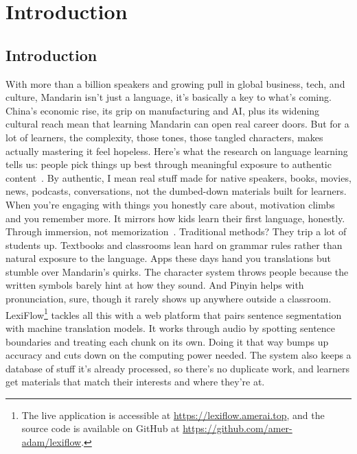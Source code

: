\chapter{Introduction}
\section{Introduction}With more than a billion speakers and growing pull in global business, tech, and culture, Mandarin isn't just a language, it's basically a key to what's coming. China's economic rise, its grip on manufacturing and AI, plus its widening cultural reach mean that learning Mandarin can open real career doors. But for a lot of learners, the complexity, those tones, those tangled characters, makes actually mastering it feel hopeless. Here's what the research on language learning tells us: people pick things up best through meaningful exposure to authentic content~\citep{krashen1985,Mayer_2009}. By authentic, I mean real stuff made for native speakers, books, movies, news, podcasts, conversations, not the dumbed-down materials built for learners. When you're engaging with things you honestly care about, motivation climbs and you remember more. It mirrors how kids learn their first language, honestly. Through immersion, not memorization~\citep{cychosz2021, gowenlock2024}. Traditional methods? They trip a lot of students up. Textbooks and classrooms lean hard on grammar rules rather than natural exposure to the language. Apps these days hand you translations but stumble over Mandarin's quirks. The character system throws people because the written symbols barely hint at how they sound. And Pinyin helps with pronunciation, sure, though it rarely shows up anywhere outside a classroom. LexiFlow\footnote{The live application is accessible at \url{https://lexiflow.amerai.top}, and the source code is available on GitHub at \url{https://github.com/amer-adam/lexiflow}.} tackles all this with a web platform that pairs sentence segmentation with machine translation models. It works through audio by spotting sentence boundaries and treating each chunk on its own. Doing it that way bumps up accuracy and cuts down on the computing power needed. The system also keeps a database of stuff it's already processed, so there's no duplicate work, and learners get materials that match their interests and where they're at.
